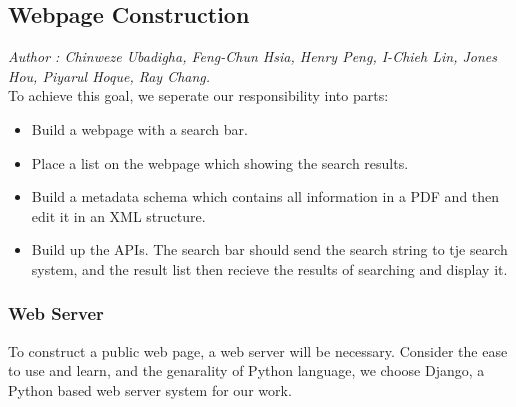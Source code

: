 \subsection{Webpage Construction}
\textit{\footnotesize Author : Chinweze Ubadigha, Feng-Chun Hsia, Henry Peng, I-Chieh Lin, Jones Hou, Piyarul Hoque, Ray Chang.}\\

To achieve this goal, we seperate our responsibility into parts:\\
\begin{itemize}
	\item Build a webpage with a search bar.
	\item Place a list on the webpage which showing the search results.
	\item Build a metadata schema which contains all information in a PDF and then edit it in an XML structure. 
	\item Build up the APIs. The search bar should send the search string to tje search system, and the result list then recieve the results of searching and display it.
\end{itemize}
\subsubsection{Web Server}
To construct a public web page, a web server will be necessary. Consider the ease to use and learn, and the genarality of Python language, we choose Django, a Python based web server system for our work.

